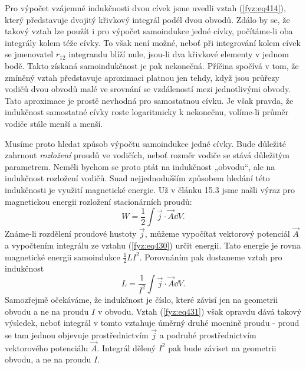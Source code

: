   Pro výpočet vzájemné indukčnosti dvou cívek jsme uvedli vztah (\ref{fyz:eq414}), který 
  představuje dvojitý křivkový integrál podél dvou obvodů. Zdálo by se, že takový vztah lze použít 
  i pro výpočet samoindukce jedné cívky, počítáme-li oba integrály kolem téže cívky. To však není 
  možné, neboť při integrování kolem cívek se jmenovatel \(r_{12}\) integrandu blíží nule, jsou-li 
  dva křivkové elementy v jednom bodě. Takto získaná samoindukčnost je pak nekonečná. Příčina 
  spočívá v tom, že zmíněný vztah představuje aproximaci platnou jen tehdy, když jsou průřezy 
  vodičů dvou obvodů malé ve srovnání se vzdáleností mezi jednotlivými obvody. Tato aproximace je 
  prostě nevhodná pro samostatnou cívku. Je však pravda, že indukčnost samostatné cívky roste 
  logaritmicky k nekonečnu, volíme-li průměr vodiče stále menší a menší. 
  
  Musíme proto hledat způsob výpočtu samoindukce jedné cívky. Bude důležité zahrnout 
  \emph{rozložení} proudů ve vodičích, neboť rozměr vodiče se stává důležitým parametrem. Neměli 
  bychom se proto ptát na indukčnost „obvodu“, ale na indukčnost rozložení vodičů. Snad 
  nejjednodušším způsobem hledání této indukčnosti je využití magnetické energie. Už v článku 15.3 
  jsme našli výraz pro magnetickou energii rozložení stacionárních proudů:
  \begin{equation}\label{fyz:eq430}
    W = \frac{1}{2}\int\vec{j}\cdot\vec{A}\dd{V}.
  \end{equation}
  Známe-li rozdělení proudové hustoty \(\vec{j}\), můžeme vypočítat vektorový potenciál \(\vec{A}\) 
  a vypočtením integrálu ze vztahu (\ref{fyz:eq430}) určit energii. Tato energie je rovna 
  magnetické energii samoindukce \(\frac{1}{2}LI^2\). Porovnáním pak dostaneme vztah pro indukčnost
  \begin{equation}\label{fyz:eq431}
    L = \frac{1}{I^2}\int\vec{j}\cdot\vec{A}\dd{V}.
  \end{equation}
  Samozřejmě očekáváme, že indukčnost je číslo, které závisí jen na geometrii obvodu a ne na proudu 
  \(I\) v obvodu. Vztah (\ref{fyz:eq431}) však opravdu dává takový výsledek, neboť integrál v tomto 
  vztahuje úměrný druhé mocnině proudu - proud se tam jednou objevuje prostřednictvím \(\vec{j}\) a 
  podruhé prostřednictvím vektorového potenciálu \(\vec{A}\). Integrál dělený \(I^2\) pak bude 
  záviset na geometrii obvodu, a ne na proudu \(I\).
  
